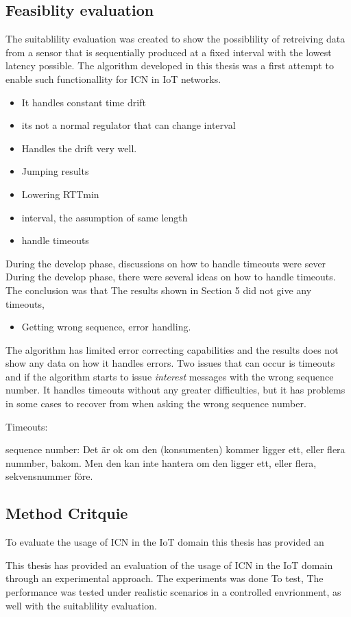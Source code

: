 \subsection{Feasiblity evaluation}
The suitablility evaluation was created to show the possiblility of retreiving data from a sensor that is sequentially produced at a fixed interval with the lowest latency possible. The algorithm developed in this thesis was a first attempt to enable such functionallity for ICN in IoT networks.

\begin{itemize}
\item It handles constant time drift
\item its not a normal regulator that can change interval
\item Handles the drift very well.
\end{itemize}

\begin{itemize}
\item Jumping results
\item Lowering RTTmin
\item interval, the assumption of same length
\item handle timeouts
\end{itemize}
During the develop phase, discussions on how to handle timeouts were sever
During the develop phase, there were several ideas on how to handle timeouts. The conclusion was that 
The results shown in Section 5 did not give any timeouts, 
\begin{itemize}
\item Getting wrong sequence, error handling.
\end{itemize}

The algorithm has limited error correcting capabilities and the results does not show any data on how it handles errors. Two issues that can occur is timeouts and if the algorithm starts to issue \textit{interest} messages with the wrong sequence number. It handles timeouts without any greater difficulties, but it has problems in some cases to recover from when asking the wrong sequence number. 

Timeouts:


sequence number:
Det är ok om den (konsumenten) kommer ligger ett, eller flera nummber, bakom. Men den kan inte hantera om den ligger ett, eller flera, sekvensnummer före.




\subsection{Method Critquie}
To evaluate the usage of ICN in the IoT domain this thesis has provided an

This thesis has provided an evaluation of the usage of ICN in the IoT domain through an experimental approach. The experiments was done
To test, 
The performance was tested under realistic scenarios in a controlled envrionment, as well with the suitablility evaluation.


